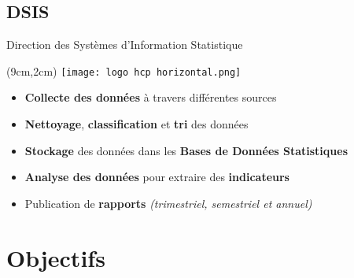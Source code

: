 \documentclass[10pt,sans,usenames,dvipsnames,english,compress]{beamer}
\begin{document}
\subsection{DSIS}
\begin{frame}{Direction des Systèmes d’Information Statistique}
	\begin{textblock*}{3cm}(9cm,2cm) %
		\texttt{[image: logo hcp horizontal.png]}
	\end{textblock*}

	\vspace{1cm}

	\begin{itemize}
		\item \textbf{Collecte des données} à travers différentes sources
            \item \textbf{Nettoyage}, \textbf{classification} et \textbf{tri} des données
            \item \textbf{Stockage} des données dans les \textbf{Bases de Données Statistiques}
            \item \textbf{Analyse des données} pour extraire des \textbf{indicateurs}
            \item Publication de \textbf{rapports} \emph{(trimestriel, semestriel et annuel)}
	\end{itemize}
\end{frame}

\section{Objectifs}
\end{document}
